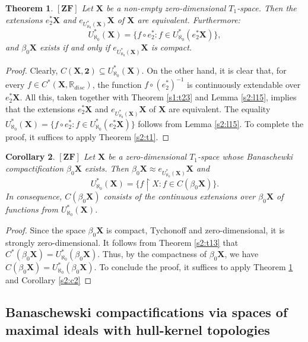 \documentclass[12pt,twoside,leqno]{article}
\theoremstyle{plain}
\newtheorem{theorem}{Theorem}[section]
\newtheorem{corollary}[theorem]{Corollary}
\theoremstyle{definition}
\theoremstyle{remark}
\begin{document}
\begin{theorem}
	\label{s2:t16}
	$[\mathbf{ZF}]$ Let $\mathbf{X}$ be a non-empty zero-dimensional $T_1$-space. Then the extensions $e_2^{\ast}\mathbf{X}$ and $e_{U_{\aleph_0}^{\ast}(\mathbf{X})}\mathbf{X}$ of $\mathbf{X}$ are equivalent.  Furthermore:
	$$U_{\aleph_0}^{\ast}(\mathbf{X})=\{ f\circ e_2^{\ast}: f\in U_{\aleph_0}^{\ast}(e_2^{\ast}\mathbf{X})\},$$
	and $\beta_0\mathbf{X}$ exists if and only if $e_{U_{\aleph_0}^{\ast}(\mathbf{X})}\mathbf{X}$ is compact.
\end{theorem}
\begin{proof}
	Clearly, $C(\mathbf{X}, \mathbf{2})\subseteq U_{\aleph_0}^{\ast}(\mathbf{X})$. On the other hand, it is clear that, for every $f\in C^{\ast}(\mathbf{X}, \mathbb{R}_{disc})$, the function $f\circ (e_2^{\ast})^{-1}$ is continuously extendable over $e_2^{\ast}\mathbf{X}$. All this, taken together with Theorem \ref{s1:t23} and Lemma \ref{s2:l15}, implies that the extensions $e_2^{\ast}\mathbf{X}$ and $e_{U_{\aleph_0}^{\ast}(\mathbf{X})}\mathbf{X}$ of $\mathbf{X}$ are equivalent. The equality $U_{\aleph_0}^{\ast}(\mathbf{X})=\{ f\circ e_2^{\ast}: f\in U_{\aleph_0}^{\ast}(e_2^{\ast}\mathbf{X})\}$ follows from Lemma \ref{s2:l15}. To complete the proof, it suffices to apply Theorem \ref{s2:t1}.
\end{proof}

\begin{corollary}
	\label{s2:c17}
	$[\mathbf{ZF}]$ Let $\mathbf{X}$ be a zero-dimensional $T_1$-space whose Banaschewki compactification $\beta_0\mathbf{X}$ exists. Then $\beta_0\mathbf{X}\approx e_{U_{\aleph_0}^{\ast}(\mathbf{X})}\mathbf{X}$ and 
	$$U_{\aleph_0}^{\ast}(\mathbf{X})=\{ f\upharpoonright X: f\in C(\beta_0\mathbf{X})\}.$$
	In consequence, $C(\beta_0\mathbf{X})$ consists of the continuous extensions over $\beta_0\mathbf{X}$ of functions from $U_{\aleph_0}^{\ast}(\mathbf{X})$.
\end{corollary}
\begin{proof}
	Since the space $\beta_0\mathbf{X}$ is compact, Tychonoff and zero-dimensional, it is strongly zero-dimensional. It follows from Theorem \ref{s2:t13} that $C^{\ast}(\beta_0\mathbf{X})=U_{\aleph_0}^{\ast}(\beta_0\mathbf{X})$. Thus, by the compactness of $\beta_0\mathbf{X}$, we have $C(\beta_{0}\mathbf{X})=U_{\aleph_0}^{\ast}(\beta_0\mathbf{X})$. To conclude the proof, it suffices to apply Theorem \ref{s2:t16} and Corollary \ref{s2:c2}
\end{proof}

\subsection{Banaschewski compactifications via spaces of maximal ideals with hull-kernel topologies}
\label{s2.3}
\end{document}
